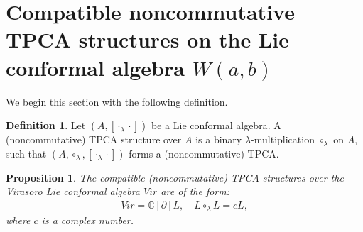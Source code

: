 \documentclass[11pt,letterpaper,reqno]{amsart}
\newtheorem{proposition}[theorem]{Proposition}
\theoremstyle{definition}
\newtheorem{definition}[theorem]{Definition}
\numberwithin{equation}{section}
\begin{document}
\section{Compatible noncommutative TPCA structures on the Lie conformal algebra $W(a,b)$}\label{sec5}
We begin this section with the following definition.
\begin{definition}
Let $(A,[{\cdot_ \lambda \cdot}])$ be a {Lie conformal algebra}. A (noncommutative) TPCA structure over $A$ is a binary $\lambda$-multiplication $\circ_{\lambda}$ on $A$, such that $(A,\circ_{\lambda},[{\cdot_ \lambda \cdot}])$ forms a (noncommutative) TPCA.
\end{definition}

\begin{proposition}
The compatible (noncommutative) TPCA structures over the Virasoro Lie conformal algebra $Vir$ are of the form:
   \begin{align}
        Vir=\mathbb{C}[\partial]L,\quad L\circ_\lambda L=cL,
   \end{align}
where $c$ is a complex number. %
\end{proposition}
\end{document}
